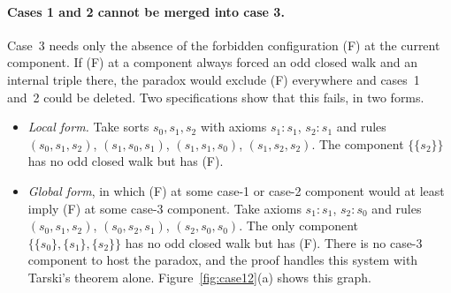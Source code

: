 \documentclass[10pt]{article}
\begin{document}
\paragraph{Cases 1 and 2 cannot be merged into case 3.}
Case~3 needs only the absence of the forbidden configuration (F) at the current
component. If (F) at a component always forced an odd closed walk and an internal
triple there, the paradox would exclude (F) everywhere and cases~1 and~2 could be
deleted. Two specifications show that this fails, in two forms.
\begin{itemize}
\item \emph{Local form.} Take sorts $s_0,s_1,s_2$ with axioms $s_1{:}s_1$,
  $s_2{:}s_1$ and rules $(s_0,s_1,s_2)$, $(s_1,s_0,s_1)$, $(s_1,s_1,s_0)$,
  $(s_1,s_2,s_2)$. The component $\{\{s_2\}\}$ has no odd closed walk but has (F).
\item \emph{Global form}, in which (F) at some case-1 or case-2 component would at
  least imply (F) at some case-3 component. Take axioms $s_1{:}s_1$, $s_2{:}s_0$ and
  rules $(s_0,s_1,s_2)$, $(s_0,s_2,s_1)$, $(s_2,s_0,s_0)$. The only component
  $\{\{s_0\},\{s_1\},\{s_2\}\}$ has no odd closed walk but has (F). There is no
  case-3 component to host the paradox, and the proof handles this system with
  Tarski's theorem alone. Figure~\ref{fig:case12}(a) shows this graph.
\end{itemize}
\end{document}
